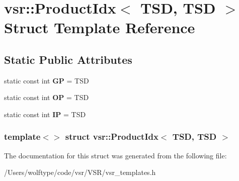 \hypertarget{structvsr_1_1_product_idx_3_01_t_s_d_00_01_t_s_d_01_4}{\section{vsr\-:\-:Product\-Idx$<$ T\-S\-D, T\-S\-D $>$ Struct Template Reference}
\label{structvsr_1_1_product_idx_3_01_t_s_d_00_01_t_s_d_01_4}
}
\subsection*{Static Public Attributes}
\begin{DoxyCompactItemize}
\item 
\hypertarget{structvsr_1_1_product_idx_3_01_t_s_d_00_01_t_s_d_01_4_a783087c95aadc15c8c1399419d7a77af}{static const int {\bfseries G\-P} = T\-S\-D}\label{structvsr_1_1_product_idx_3_01_t_s_d_00_01_t_s_d_01_4_a783087c95aadc15c8c1399419d7a77af}

\item 
\hypertarget{structvsr_1_1_product_idx_3_01_t_s_d_00_01_t_s_d_01_4_a2e8e2ef307171d4ffa15eff2a489bcd4}{static const int {\bfseries O\-P} = T\-S\-D}\label{structvsr_1_1_product_idx_3_01_t_s_d_00_01_t_s_d_01_4_a2e8e2ef307171d4ffa15eff2a489bcd4}

\item 
\hypertarget{structvsr_1_1_product_idx_3_01_t_s_d_00_01_t_s_d_01_4_a830157c891a652516b2a631dbde9335e}{static const int {\bfseries I\-P} = T\-S\-D}\label{structvsr_1_1_product_idx_3_01_t_s_d_00_01_t_s_d_01_4_a830157c891a652516b2a631dbde9335e}

\end{DoxyCompactItemize}
\subsubsection*{template$<$$>$ struct vsr\-::\-Product\-Idx$<$ T\-S\-D, T\-S\-D $>$}



The documentation for this struct was generated from the following file\-:\begin{DoxyCompactItemize}
\item 
/\-Users/wolftype/code/vsr/\-V\-S\-R/vsr\-\_\-templates.\-h\end{DoxyCompactItemize}

